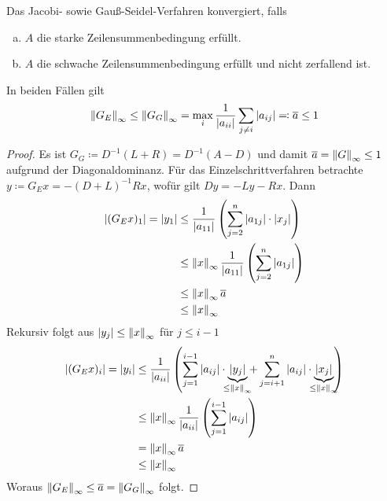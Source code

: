 \begin{Satze}[Zeilensummenkriterium]
  \label{9.3.9}
  Das Jacobi- sowie Gauß-Seidel-Verfahren konvergiert, falls 
  \begin{enumerate}[a)]
  \item $A$ die starke Zeilensummenbedingung erfüllt.
  \item $A$ die schwache Zeilensummenbedingung erfüllt und nicht
    zerfallend ist.
  \end{enumerate}
In beiden Fällen gilt
\begin{gather}
  \nn[G_E]_\infty \leq \nn[G_G]_\infty 
  = \max_i\frac{1}{|a_{ii}|}\sum_{j\neq i} |a_{ij}|
  \eqqcolon \overline{a} \leq 1
  \label{IX.3.9}
\end{gather}
\begin{proof}
  Es ist $G_G\coloneqq D^{-1}(L+R) = D^{-1}(A-D)$ und damit 
  $\overline{a}=\nn[G]_\infty\leq 1$ aufgrund der Diagonaldominanz.
  Für das Einzelschrittverfahren betrachte 
    $y\coloneqq G_E x=-(D+L)^{-1}Rx$, wofür gilt
$Dy = -Ly-Rx$. Dann
\begin{align*}
  |(G_Ex)_1| = |y_1| &\leq \frac{1}{|a_{11}|}\left(
                       \sum_{j=2}^{n}|a_{1j}|\cdot |x_j|
                       \right) \\
                     &\leq \nn[x]_\infty \frac{1}{|a_{11}|}\left(
                       \sum_{j=2}^{n}|a_{1j}|
                       \right) \\
                     &\leq \nn[x]_\infty \overline{a}\\
                     &\leq \nn[x]_\infty
\end{align*}
Rekursiv folgt aus $|y_j|\leq \nn[x]_\infty $ für $j\leq i-1$
\begin{align}\nonumber
  |(G_Ex)_i| = |y_i| &\leq \frac{1}{|a_{ii}|}\left(
                       \sum_{j=1}^{i-1}|a_{ij}|
                       \cdot \underbrace{|y_j|}_{\mathclap{\leq\nn[x]_\infty}}
                       +\sum_{j=i+1}^{n}|a_{ij}|
                       \cdot \underbrace{|x_j|}_{\mathclap{\leq\nn[x]_\infty}}
                       \right)\\\nonumber
                     &\leq \nn[x]_\infty \frac{1}{|a_{ii}|}\left(
                       \sum_{j=1}^{i-1}|a_{ij}|
                       \right) \\\nonumber
                     &=\nn[x]_\infty \overline{a}\\
  &\leq \nn[x]_\infty
    \label{IX.3.10}
\end{align}
Woraus $\nn[G_E]_\infty \leq \overline{a}=\nn[G_G]_\infty$ folgt.


\end{proof}
\end{Satze}
